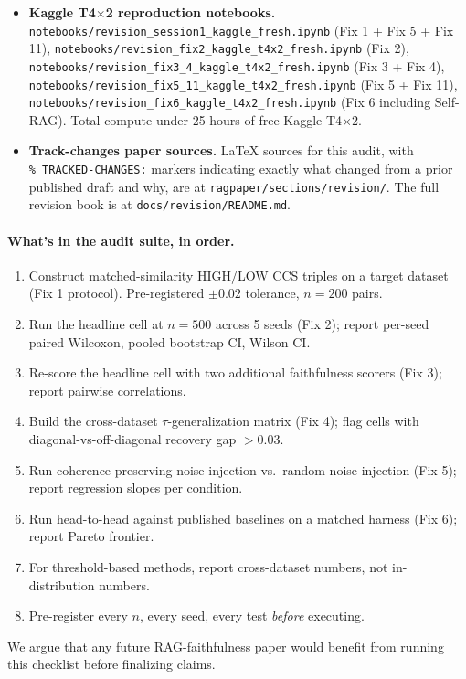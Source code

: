 \begin{itemize}
\item \textbf{Kaggle T4\(\times\)2 reproduction notebooks.}
\texttt{notebooks/revision\_session1\_kaggle\_fresh.ipynb} (Fix 1 +
Fix 5 + Fix 11),
\texttt{notebooks/revision\_fix2\_kaggle\_t4x2\_fresh.ipynb} (Fix 2),
\texttt{notebooks/revision\_fix3\_4\_kaggle\_t4x2\_fresh.ipynb}
(Fix 3 + Fix 4),
\texttt{notebooks/revision\_fix5\_11\_kaggle\_t4x2\_fresh.ipynb}
(Fix 5 + Fix 11),
\texttt{notebooks/revision\_fix6\_kaggle\_t4x2\_fresh.ipynb} (Fix 6
including Self-RAG).
Total compute under 25 hours of free Kaggle T4\(\times\)2.

\item \textbf{Track-changes paper sources.} LaTeX sources for this
audit, with \texttt{\%~TRACKED-CHANGES:} markers indicating
exactly what changed from a prior published draft and why, are at
\texttt{ragpaper/sections/revision/}. The full revision book is at
\texttt{docs/revision/README.md}.
\end{itemize}

\paragraph{What's in the audit suite, in order.}

\begin{enumerate}
\itemsep -2pt
\item Construct matched-similarity HIGH/LOW CCS triples on a
target dataset (Fix 1 protocol). Pre-registered $\pm 0.02$ tolerance,
$n{=}200$ pairs.
\item Run the headline cell at $n{=}500$ across 5 seeds (Fix 2);
report per-seed paired Wilcoxon, pooled bootstrap CI, Wilson CI.
\item Re-score the headline cell with two additional faithfulness
scorers (Fix 3); report pairwise correlations.
\item Build the cross-dataset $\tau$-generalization matrix (Fix 4);
flag cells with diagonal-vs-off-diagonal recovery gap $> 0.03$.
\item Run coherence-preserving noise injection vs.\ random
noise injection (Fix 5); report regression slopes per condition.
\item Run head-to-head against published baselines on a matched
harness (Fix 6); report Pareto frontier.
\item For threshold-based methods, report cross-dataset numbers,
not in-distribution numbers.
\item Pre-register every $n$, every seed, every test
\emph{before} executing.
\end{enumerate}

We argue that any future RAG-faithfulness paper would benefit
from running this checklist before finalizing claims.
